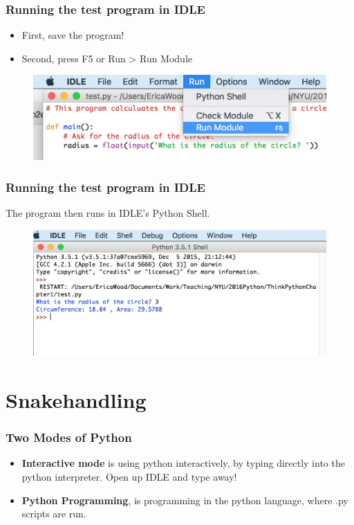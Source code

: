 \documentclass{beamer}
\newcommand{\<}{\langle}
\renewcommand{\>}{\rangle}
\begin{document}
\begin{frame}
\frametitle{Running the test program in IDLE}

\begin{itemize}
\item First, save the program!  
\item Second, press F5 or Run > Run Module
\end{itemize}
\begin{figure}
\centering
\includegraphics[scale=.2]{IMG/6idle.jpg}
\end{figure}
\end{frame}



\begin{frame}
\frametitle{Running the test program in IDLE}

The program then runs in IDLE's Python Shell.

\begin{figure}
\centering
\includegraphics[scale=.2]{IMG/7idle.jpg}
\end{figure}

\end{frame}


\section{Snakehandling}
\begin{frame}
\frametitle{Two Modes of Python}

\begin{itemize}
\item \textbf{Interactive mode} is using python interactively, by typing directly into the python interpreter. Open up IDLE and type away!
\item \textbf{Python Programming}, is programming in the python language, where .py scripts are run.
\end{itemize}
\end{frame}
\end{document}
